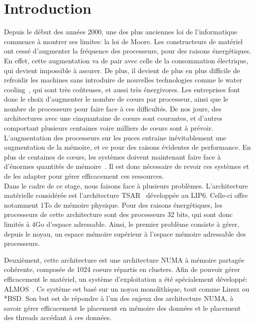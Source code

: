 \chapter{Introduction}
\label{chap:intro}

  Depuis le début des années 2000, une des plus anciennes loi de l'informatique
  commence à montrer ses limites: la loi de Moore. Les constructeurs de matériel
  ont cessé d'augmenter la fréquence des processeurs, pour des raisons
  énergétiques. En effet, cette augmentation va de pair avec celle de la
  consommation électrique, qui devient impossible à assurer. De plus, il devient
  de plus en plus difficile de refroidir les machines sans introduire de
  nouvelles technologies comme le water cooling~\citep{googleXXXXdatacenters},
  qui sont très coûteuses, et aussi très énergivores. Les entreprises font donc
  le choix d'augmenter le nombre de c\oe urs par processeur, ainsi que le nombre
  de processeurs pour faire face à ces difficultés. De nos jours, des
  architectures avec une cinquantaine de c\oe urs sont courantes, et d'autres
  comportant plusieurs centaines voire milliers de c\oe urs sont à
  prévoir. L'augmentation des processeurs sur les puces entraine inévitablement
  une augmentation de la mémoire, et ce pour des raisons évidentes de
  performance. En plus de centaines de c\oe urs, les systèmes doivent maintenant
  faire face à d'énormes quantités de mémoire~\citep{hp2012z820,
    puget2013z9pe}. Il est donc nécessaire de revoir ces systèmes et de les
  adapter pour gérer efficacement ces ressources.\\

  Dans le cadre de ce stage, nous faisons face à plusieurs
  problèmes. L'architecture matérielle considérée est l'architecture
  TSAR~\citep{greiner2009tsar} développée au LIP6. Celle-ci offre notamment 1To
  de mémoire physique. Pour des raisons énergétiques, les processeurs de cette
  architecture sont des processeurs 32 bits, qui sont donc limités à 4Go
  d'espace adressable. Ainsi, le premier problème consiste à gérer, depuis le
  noyau, un espace mémoire supérieur à l'espace mémoire adressable des
  processeurs.

  Deuxièment, cette architecture est une architecture NUMA à mémoire partagée
  cohérente, composée de 1024 coeurs répartis en clusters. Afin de pouvoir gérer
  efficacement le matériel, un système d'exploitation a été spécialement
  développé: ALMOS~\citep{almaless2011almos}. Ce système est basé sur un noyau
  monolithique, tout comme Linux ou *BSD. Son but est de répondre à l'un des
  enjeux des architecture NUMA, à savoir gérer efficacement le placement en
  mémoire des données et le placement des threads accédant à ces données.

